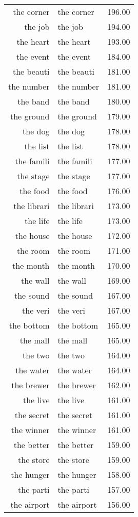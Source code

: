 \begin{table}[ht]
\begin{tabular}{rlr}
  the corner & the corner & 196.00 \\ 
  the job & the job & 194.00 \\ 
  the heart & the heart & 193.00 \\ 
  the event & the event & 184.00 \\ 
  the beauti & the beauti & 181.00 \\ 
  the number & the number & 181.00 \\ 
  the band & the band & 180.00 \\ 
  the ground & the ground & 179.00 \\ 
  the dog & the dog & 178.00 \\ 
  the list & the list & 178.00 \\ 
  the famili & the famili & 177.00 \\ 
  the stage & the stage & 177.00 \\ 
  the food & the food & 176.00 \\ 
  the librari & the librari & 173.00 \\ 
  the life & the life & 173.00 \\ 
  the house & the house & 172.00 \\ 
  the room & the room & 171.00 \\ 
  the month & the month & 170.00 \\ 
  the wall & the wall & 169.00 \\ 
  the sound & the sound & 167.00 \\ 
  the veri & the veri & 167.00 \\ 
  the bottom & the bottom & 165.00 \\ 
  the mall & the mall & 165.00 \\ 
  the two & the two & 164.00 \\ 
  the water & the water & 164.00 \\ 
  the brewer & the brewer & 162.00 \\ 
  the live & the live & 161.00 \\ 
  the secret & the secret & 161.00 \\ 
  the winner & the winner & 161.00 \\ 
  the better & the better & 159.00 \\ 
  the store & the store & 159.00 \\ 
  the hunger & the hunger & 158.00 \\ 
  the parti & the parti & 157.00 \\ 
  the airport & the airport & 156.00 \\ 

\end{tabular}
\end{table}
